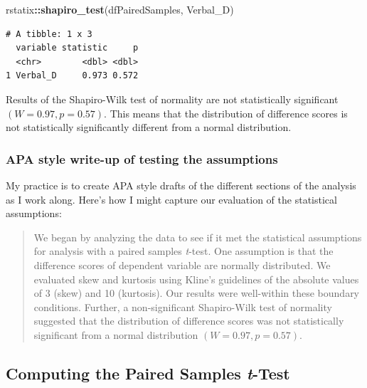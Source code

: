\documentclass[
  11pt,
]{book}
\newenvironment{Shaded}{\begin{snugshade}}{\end{snugshade}}
\newcommand{\FunctionTok}[1]{\textcolor[rgb]{0.27,0.27,0.27}{\textbf{#1}}}
\newcommand{\NormalTok}[1]{#1}
\newcommand{\SpecialCharTok}[1]{\textcolor[rgb]{0.43,0.43,0.43}{\textbf{#1}}}
\begin{document}
\begin{Shaded}
\begin{Highlighting}[]
\NormalTok{rstatix}\SpecialCharTok{::}\FunctionTok{shapiro\_test}\NormalTok{(dfPairedSamples, Verbal\_D)}
\end{Highlighting}
\end{Shaded}

\begin{verbatim}
# A tibble: 1 x 3
  variable statistic     p
  <chr>        <dbl> <dbl>
1 Verbal_D     0.973 0.572
\end{verbatim}

Results of the Shapiro-Wilk test of normality are not statistically significant \((W = 0.97, p = 0.57)\). This means that the distribution of difference scores is not statistically significantly different from a normal distribution.

\hypertarget{apa-style-write-up-of-testing-the-assumptions-1}{%
\subsubsection{APA style write-up of testing the assumptions}\label{apa-style-write-up-of-testing-the-assumptions-1}}

My practice is to create APA style drafts of the different sections of the analysis as I work along. Here's how I might capture our evaluation of the statistical assumptions:

\begin{quote}
We began by analyzing the data to see if it met the statistical assumptions for analysis with a paired samples \emph{t}-test. One assumption is that the difference scores of dependent variable are normally distributed. We evaluated skew and kurtosis using Kline's \citeyearpar{kline_data_2016} guidelines of the absolute values of 3 (skew) and 10 (kurtosis). Our results were well-within these boundary conditions. Further, a non-significant Shapiro-Wilk test of normality suggested that the distribution of difference scores was not statistically significant from a normal distribution \((W = 0.97, p = 0.57)\).
\end{quote}

\hypertarget{computing-the-paired-samples-t-test}{%
\subsection{\texorpdfstring{Computing the Paired Samples \emph{t}-Test}{Computing the Paired Samples t-Test}}\label{computing-the-paired-samples-t-test}}
\end{document}
